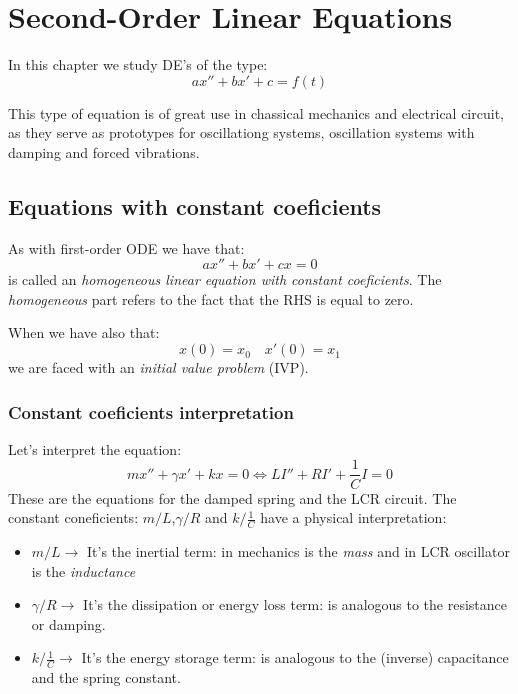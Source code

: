 \documentclass[../ode.tex]{subfiles}
\begin{document}
    \chapter{\sffamily Second-Order Linear Equations}
    
    In this chapter we study DE's of the type:
    \begin{equation*}
        ax'' + bx' + c = f(t)
    \end{equation*}
    
    This type of equation is of great use in chassical mechanics and electrical circuit, as they serve as prototypes for
    oscillationg systems, oscillation systems with damping and forced vibrations.

    \section{\sffamily Equations with constant coeficients}

    As with first-order ODE we have that:
    \begin{equation*}
        ax'' + bx' +cx = 0
    \end{equation*}
    is called an \emph{homogeneous linear equation with constant coeficients}. The \emph{homogeneous} part refers to the fact that
    the RHS is equal to zero.

    When we have also that:
    \begin{equation*}
        x(0) = x_0 \quad x'(0) = x_1
    \end{equation*}
    we are faced with an \emph{initial value problem} (IVP).
    
    \subsection{\sffamily Constant coeficients interpretation}
    Let's interpret the equation:
    \begin{equation*}
        mx'' + \gamma x' + kx =0 \iff LI'' + RI' + \frac{1}{C}I = 0
    \end{equation*}
    These are the equations for the damped spring and the LCR circuit. The constant coneficients: $m/L$,$\gamma/R$ and
    $k/\frac{1}{C}$ have a physical interpretation:
    \begin{itemize}
        \item  $m/L \longrightarrow$ It's the inertial term: in mechanics is the \emph{mass} and in LCR oscillator is the
            \emph{inductance} 
        \item  $\gamma / R\longrightarrow$ It's the dissipation or energy loss term: is analogous to the resistance or damping.
        \item  $k/ \frac{1}{C}\longrightarrow$ It's the energy storage term: is analogous to the (inverse) capacitance and the
            spring constant.
    \end{itemize}
 
\end{document}
